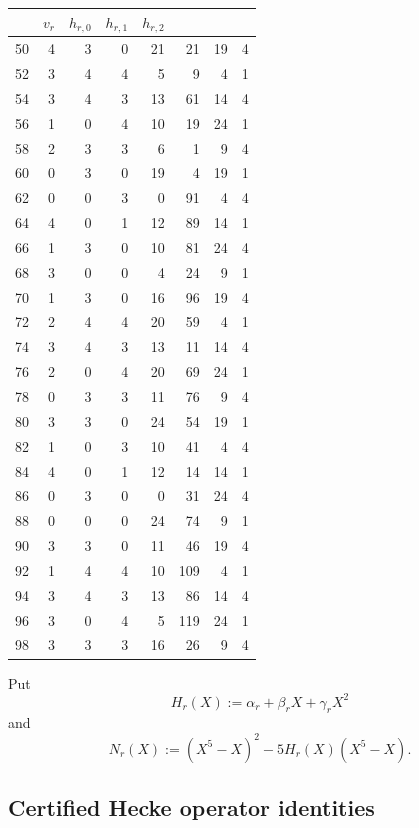 \documentclass[11pt]{article}
\theoremstyle{plain}
\theoremstyle{definition}
\theoremstyle{remark}
\numberwithin{equation}{section}
\begin{document}
\begin{table}[H]
\begin{tabular}{@{}c|rrrrrrr@{}}
& \(v_r\) & \(h_{r,0}\) & \(h_{r,1}\) & \(h_{r,2}\)\\
\midrule
50 & 4 & 3 & 0 & 21 & 21  & 19 & 4\\
52 & 3 & 4 & 4 & 5  & 9   & 4  & 1\\
54 & 3 & 4 & 3 & 13 & 61  & 14 & 4\\
56 & 1 & 0 & 4 & 10 & 19  & 24 & 1\\
58 & 2 & 3 & 3 & 6  & 1   & 9  & 4\\
60 & 0 & 3 & 0 & 19 & 4   & 19 & 1\\
62 & 0 & 0 & 3 & 0  & 91  & 4  & 4\\
64 & 4 & 0 & 1 & 12 & 89  & 14 & 1\\
66 & 1 & 3 & 0 & 10 & 81  & 24 & 4\\
68 & 3 & 0 & 0 & 4  & 24  & 9  & 1\\
70 & 1 & 3 & 0 & 16 & 96  & 19 & 4\\
72 & 2 & 4 & 4 & 20 & 59  & 4  & 1\\
74 & 3 & 4 & 3 & 13 & 11  & 14 & 4\\
76 & 2 & 0 & 4 & 20 & 69  & 24 & 1\\
78 & 0 & 3 & 3 & 11 & 76  & 9  & 4\\
80 & 3 & 3 & 0 & 24 & 54  & 19 & 1\\
82 & 1 & 0 & 3 & 10 & 41  & 4  & 4\\
84 & 4 & 0 & 1 & 12 & 14  & 14 & 1\\
86 & 0 & 3 & 0 & 0  & 31  & 24 & 4\\
88 & 0 & 0 & 0 & 24 & 74  & 9  & 1\\
90 & 3 & 3 & 0 & 11 & 46  & 19 & 4\\
92 & 1 & 4 & 4 & 10 & 109 & 4  & 1\\
94 & 3 & 4 & 3 & 13 & 86  & 14 & 4\\
96 & 3 & 0 & 4 & 5  & 119 & 24 & 1\\
98 & 3 & 3 & 3 & 16 & 26  & 9  & 4\\
\bottomrule
\end{tabular}
\end{table}

Put \[ H_r(X):=\alpha_r+\beta_rX+\gamma_rX^2 \] and \begin{equation} N_r(X):=(X^5-X)^2-5H_r(X)(X^5-X). \label{eq:p5-mod125-numerator} \end{equation}



\subsection{Certified Hecke operator identities}
\end{document}
